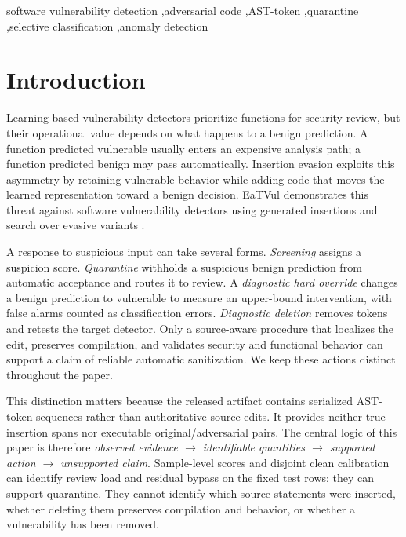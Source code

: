 \documentclass[a4paper,fleqn]{cas-dc}
\begin{document}
\begin{keywords}
software vulnerability detection \sep adversarial code \sep AST-token \sep quarantine \sep selective classification \sep anomaly detection
\end{keywords}

\maketitle

\section{Introduction}\label{sec:introduction}

Learning-based vulnerability detectors prioritize functions for security review, but their operational value depends on what happens to a benign prediction. A function predicted vulnerable usually enters an expensive analysis path; a function predicted benign may pass automatically. Insertion evasion exploits this asymmetry by retaining vulnerable behavior while adding code that moves the learned representation toward a benign decision. EaTVul demonstrates this threat against software vulnerability detectors using generated insertions and search over evasive variants \cite{liu2024eatvul}.

A response to suspicious input can take several forms. \emph{Screening} assigns a suspicion score. \emph{Quarantine} withholds a suspicious benign prediction from automatic acceptance and routes it to review. A \emph{diagnostic hard override} changes a benign prediction to vulnerable to measure an upper-bound intervention, with false alarms counted as classification errors. \emph{Diagnostic deletion} removes tokens and retests the target detector. Only a source-aware procedure that localizes the edit, preserves compilation, and validates security and functional behavior can support a claim of reliable automatic sanitization. We keep these actions distinct throughout the paper.

This distinction matters because the released artifact contains serialized AST-token sequences rather than authoritative source edits. It provides neither true insertion spans nor executable original/adversarial pairs. The central logic of this paper is therefore
\emph{observed evidence $\rightarrow$ identifiable quantities $\rightarrow$ supported action $\rightarrow$ unsupported claim}. Sample-level scores and disjoint clean calibration can identify review load and residual bypass on the fixed test rows; they can support quarantine. They cannot identify which source statements were inserted, whether deleting them preserves compilation and behavior, or whether a vulnerability has been removed.
\end{document}
